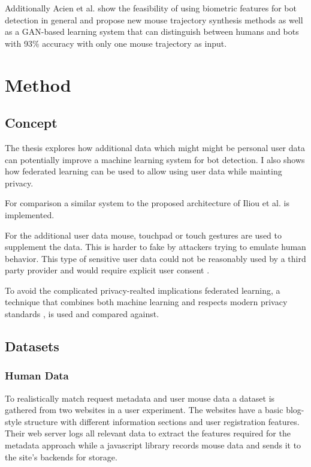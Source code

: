 \documentclass[
    fontsize=12pt,
    headings=small,
    parskip=half,           %
    bibliography=totoc,
    numbers=noenddot,       %
    open=any,               %
    final                   %
    ]{scrreprt}
\begin{document}
Additionally Acien et al. \cite{Acien2020BeCAPTCHAMouseSM} show the feasibility of using biometric features for bot detection in general and propose new mouse trajectory synthesis methods as well as a GAN-based learning system that can distinguish between humans and bots with 93\% accuracy with only one mouse trajectory as input.


\chapter{Method}


\section{Concept}

The thesis explores how additional data which might might be personal user data can potentially improve a machine learning system for bot detection. I also shows how federated learning can be used to allow using user data while mainting privacy.

For comparison a similar system to the proposed architecture of Iliou et al. \cite{10.1145/3339252.3339267} is implemented.

For the additional user data mouse, touchpad or touch gestures are used to supplement the data. This is harder to fake by attackers trying to emulate human behavior. This type of sensitive user data could not be reasonably used by a third party provider and would require explicit user consent \cite{GDPR}.

To avoid the complicated privacy-realted implications federated learning, a technique that combines both machine learning and respects modern privacy standards \cite{DBLP:journals/corr/KonecnyMR15} \cite{DBLP:journals/corr/KonecnyMRR16}, is used and compared against.


\section{Datasets}


\subsection{Human Data}

To realistically match request metadata and user mouse data a dataset is gathered from two websites in a user experiment. The websites have a basic blog-style structure with different information sections and user registration features. Their web server logs all relevant data to extract the features required for the metadata approach while a javascript library records mouse data and sends it to the site's backends for storage.
\end{document}
